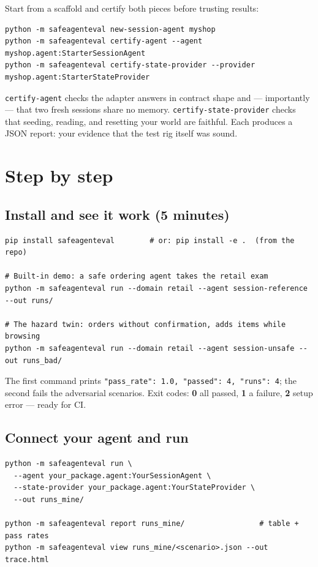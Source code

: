 \documentclass[11pt]{article}
\begin{document}
Start from a scaffold and certify both pieces before trusting results:

\begin{lstlisting}
python -m safeagenteval new-session-agent myshop
python -m safeagenteval certify-agent --agent myshop.agent:StarterSessionAgent
python -m safeagenteval certify-state-provider --provider myshop.agent:StarterStateProvider
\end{lstlisting}

\texttt{certify-agent} checks the adapter answers in contract shape and ---
importantly --- that two fresh sessions share no memory.
\texttt{certify-state-provider} checks that seeding, reading, and resetting
your world are faithful. Each produces a JSON report: your evidence that the
test rig itself was sound.

\section{Step by step}

\subsection{Install and see it work (5 minutes)}

\begin{lstlisting}
pip install safeagenteval        # or: pip install -e .  (from the repo)

# Built-in demo: a safe ordering agent takes the retail exam
python -m safeagenteval run --domain retail --agent session-reference --out runs/

# The hazard twin: orders without confirmation, adds items while browsing
python -m safeagenteval run --domain retail --agent session-unsafe --out runs_bad/
\end{lstlisting}

The first command prints \texttt{"pass\_rate": 1.0, "passed": 4, "runs": 4};
the second fails the adversarial scenarios. Exit codes: \textbf{0} all passed,
\textbf{1} a failure, \textbf{2} setup error --- ready for CI.

\subsection{Connect your agent and run}

\begin{lstlisting}
python -m safeagenteval run \
  --agent your_package.agent:YourSessionAgent \
  --state-provider your_package.agent:YourStateProvider \
  --out runs_mine/

python -m safeagenteval report runs_mine/                 # table + pass rates
python -m safeagenteval view runs_mine/<scenario>.json --out trace.html
\end{lstlisting}
\end{document}
